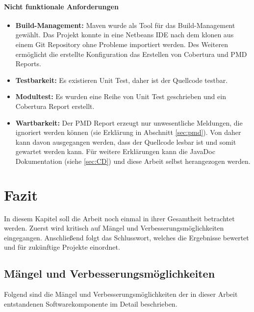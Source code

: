 \documentclass[a4paper]{article}
\begin{document}
	\paragraph{Nicht funktionale Anforderungen}
	\begin{itemize}
		\item \textbf{Build-Management:} Maven wurde als Tool für das
		Build-Management gewählt. Das Projekt konnte in eine Netbeans IDE
		nach dem klonen aus einem Git Repository ohne Probleme importiert werden.
		Des Weiteren ermöglicht die erstellte Konfiguration das Erstellen von
		Cobertura und PMD Reports. 
		\item \textbf{Testbarkeit:} Es existieren Unit Test, daher ist der Quellcode
		testbar.
		\item \textbf{Modultest:} Es wurden eine Reihe von Unit Test geschrieben und
		ein Cobertura Report erstellt.
		\item \textbf{Wartbarkeit:} Der PMD Report erzeugt nur unwesentliche
		Meldungen, die ignoriert werden können (sie Erklärung in Abschnitt
		\ref{sec:pmd}). Von daher kann davon ausgegangen werden, dass der Quellcode
		lesbar ist und somit gewartet werden kann. Für weitere Erklärungen kann
		die JavaDoc Dokumentation (siehe \autoref{sec:CD}) und diese Arbeit selbst
		herangezogen werden.
	\end{itemize} 
	
	\newpage
	\section{Fazit}
	
	In diesem Kapitel soll die Arbeit noch einmal in ihrer Gesamtheit betrachtet
	werden. Zuerst wird kritisch auf Mängel und Verbesserungsmöglichkeiten
	eingegangen. Anschließend folgt das Schlusswort, welches die Ergebnisse 
	bewertet und für zukünftige Projekte einordnet.
	
	\subsection{Mängel und Verbesserungsmöglichkeiten}
	
	Folgend sind die Mängel und Verbesserungsmöglichkeiten der in dieser Arbeit
	entstandenen Softwarekomponente im Detail beschrieben.
	
\end{document}
